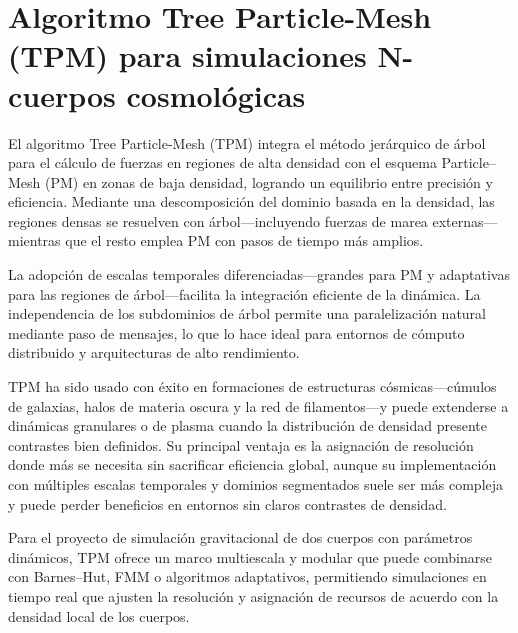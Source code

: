 \section[Algoritmo TPM para simulaciones N-cuerpos]{Algoritmo Tree Particle-Mesh (TPM) para simulaciones N-cuerpos cosmológicas}%
\label{sec:state_of_the_art_08}

El algoritmo Tree Particle-Mesh (TPM) integra el método jerárquico de árbol para el cálculo de fuerzas en regiones de alta densidad con el esquema Particle–Mesh (PM) en zonas de baja densidad, logrando un equilibrio entre precisión y eficiencia. Mediante una descomposición del dominio basada en la densidad, las regiones densas se resuelven con árbol—incluyendo fuerzas de marea externas—mientras que el resto emplea PM con pasos de tiempo más amplios.

La adopción de escalas temporales diferenciadas—grandes para PM y adaptativas para las regiones de árbol—facilita la integración eficiente de la dinámica. La independencia de los subdominios de árbol permite una paralelización natural mediante paso de mensajes, lo que lo hace ideal para entornos de cómputo distribuido y arquitecturas de alto rendimiento.

TPM ha sido usado con éxito en formaciones de estructuras cósmicas—cúmulos de galaxias, halos de materia oscura y la red de filamentos—y puede extenderse a dinámicas granulares o de plasma cuando la distribución de densidad presente contrastes bien definidos. Su principal ventaja es la asignación de resolución donde más se necesita sin sacrificar eficiencia global, aunque su implementación con múltiples escalas temporales y dominios segmentados suele ser más compleja y puede perder beneficios en entornos sin claros contrastes de densidad.

Para el proyecto de simulación gravitacional de dos cuerpos con parámetros dinámicos, TPM ofrece un marco multiescala y modular que puede combinarse con Barnes–Hut, FMM o algoritmos adaptativos, permitiendo simulaciones en tiempo real que ajusten la resolución y asignación de recursos de acuerdo con la densidad local de los cuerpos.



